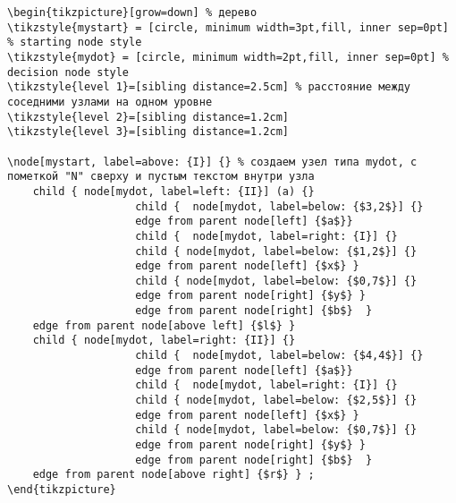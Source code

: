 \documentclass[12pt,a4paper]{article}
\begin{document}
\begin{verbatim}
\begin{tikzpicture}[grow=down] % дерево
\tikzstyle{mystart} = [circle, minimum width=3pt,fill, inner sep=0pt] % starting node style
\tikzstyle{mydot} = [circle, minimum width=2pt,fill, inner sep=0pt] % decision node style
\tikzstyle{level 1}=[sibling distance=2.5cm] % расстояние между соседними узлами на одном уровне
\tikzstyle{level 2}=[sibling distance=1.2cm]
\tikzstyle{level 3}=[sibling distance=1.2cm]

\node[mystart, label=above: {I}] {} % создаем узел типа mydot, с пометкой "N" сверху и пустым текстом внутри узла
    child { node[mydot, label=left: {II}] (a) {}
                    child {  node[mydot, label=below: {$3,2$}] {}
                    edge from parent node[left] {$a$}}
                    child {  node[mydot, label=right: {I}] {}
                    child { node[mydot, label=below: {$1,2$}] {}
                    edge from parent node[left] {$x$} }
                    child { node[mydot, label=below: {$0,7$}] {}
                    edge from parent node[right] {$y$} }
                    edge from parent node[right] {$b$}  }
    edge from parent node[above left] {$l$} }
    child { node[mydot, label=right: {II}] {}
                    child {  node[mydot, label=below: {$4,4$}] {}
                    edge from parent node[left] {$a$}}
                    child {  node[mydot, label=right: {I}] {}
                    child { node[mydot, label=below: {$2,5$}] {}
                    edge from parent node[left] {$x$} }
                    child { node[mydot, label=below: {$0,7$}] {}
                    edge from parent node[right] {$y$} }
                    edge from parent node[right] {$b$}  }
    edge from parent node[above right] {$r$} } ;
\end{tikzpicture}
        
\end{verbatim}


\newpage
{}
\end{document}

